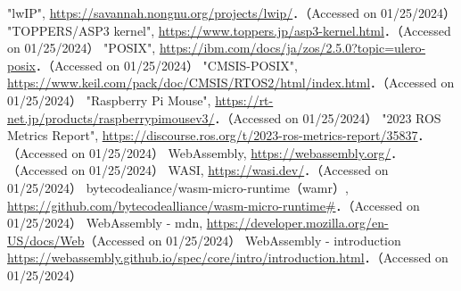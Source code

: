 \begin{thebibliography}{99}
 "lwIP", \url{https://savannah.nongnu.org/projects/lwip/}．（Accessed on 01/25/2024）
 "TOPPERS/ASP3 kernel", \url{https://www.toppers.jp/asp3-kernel.html}．（Accessed on 01/25/2024）
 "POSIX", \url{https://ibm.com/docs/ja/zos/2.5.0?topic=ulero-posix}．（Accessed on 01/25/2024）
 "CMSIS-POSIX", \url{https://www.keil.com/pack/doc/CMSIS/RTOS2/html/index.html}．（Accessed on 01/25/2024）
 "Raspberry Pi Mouse", \url{https://rt-net.jp/products/raspberrypimousev3/}．（Accessed on 01/25/2024）
 "2023 ROS Metrics Report", \url{https://discourse.ros.org/t/2023-ros-metrics-report/35837}．（Accessed on 01/25/2024）
 WebAssembly, \url{https://webassembly.org/}．（Accessed on 01/25/2024）
 WASI, \url{https://wasi.dev/}．（Accessed on 01/25/2024）
 bytecodealiance/wasm-micro-runtime（wamr）, \url{https://github.com/bytecodealliance/wasm-micro-runtime#}．（Accessed on 01/25/2024）
 WebAssembly - mdn, \url{https://developer.mozilla.org/en-US/docs/Web}（Accessed on 01/25/2024）
 WebAssembly - introduction \url{https://webassembly.github.io/spec/core/intro/introduction.html}．（Accessed on 01/25/2024）
\end{thebibliography}